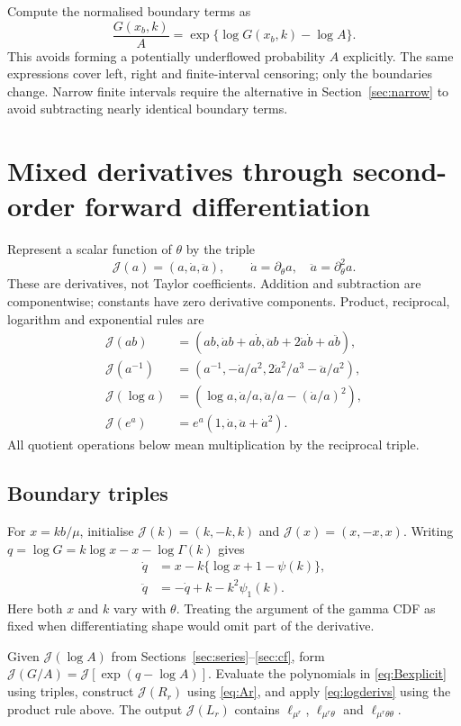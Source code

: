 \documentclass[11pt,a4paper]{article}
\newcommand{\J}{\mathcal{J}}
\begin{document}
Compute the normalised boundary terms as
\[
 \frac{G(x_b,k)}{A}=\exp\{\log G(x_b,k)-\log A\}.
\]
This avoids forming a potentially underflowed probability $A$ explicitly.
The same expressions cover left, right and finite-interval censoring; only
the boundaries change. Narrow finite intervals require the alternative in
Section~\ref{sec:narrow} to avoid subtracting nearly identical boundary terms.

\newpage
\section{Mixed derivatives through second-order forward differentiation}
Represent a scalar function of $\theta$ by the triple
\[
 \J(a)=(a,\dot a,\ddot a),\qquad
 \dot a=\partial_\theta a,\quad\ddot a=\partial_\theta^2a.
\]
These are derivatives, not Taylor coefficients. Addition and subtraction are
componentwise; constants have zero derivative components. Product, reciprocal,
logarithm and exponential rules are
\begin{align}
 \J(ab)&=(ab,\dot a b+a\dot b,\ddot a b+2\dot a\dot b+a\ddot b),\\
 \J(a^{-1})&=\left(a^{-1},-\dot a/a^2,
                   2\dot a^2/a^3-\ddot a/a^2\right),\\
 \J(\log a)&=\left(\log a,\dot a/a,
                   \ddot a/a-(\dot a/a)^2\right),\\
 \J(e^a)&=e^a(1,\dot a,\ddot a+\dot a^2).
 \label{eq:jets}
\end{align}
All quotient operations below mean multiplication by the reciprocal triple.

\subsection{Boundary triples}
For $x=kb/\mu$, initialise $\J(k)=(k,-k,k)$ and $\J(x)=(x,-x,x)$.
Writing $q=\log G=k\log x-x-\log\Gamma(k)$ gives
\begin{align}
 \dot q&=x-k\{\log x+1-\psi(k)\},\label{eq:qdot}\\
 \ddot q&=-\dot q+k-k^2\psi_1(k).\label{eq:qddot}
\end{align}
Here both $x$ and $k$ vary with $\theta$. Treating the argument of the gamma
CDF as fixed when differentiating shape would omit part of the derivative.

Given $\J(\log A)$ from Sections~\ref{sec:series}--\ref{sec:cf}, form
$\J(G/A)=\J[\exp(q-\log A)]$. Evaluate the polynomials in
\eqref{eq:Bexplicit} using triples, construct $\J(R_r)$ using
\eqref{eq:Ar}, and apply \eqref{eq:logderivs} using the product rule above.
The output $\J(L_r)$ contains $\ell_{\mu^r}$,
$\ell_{\mu^r\theta}$ and $\ell_{\mu^r\theta\theta}$.
\end{document}
